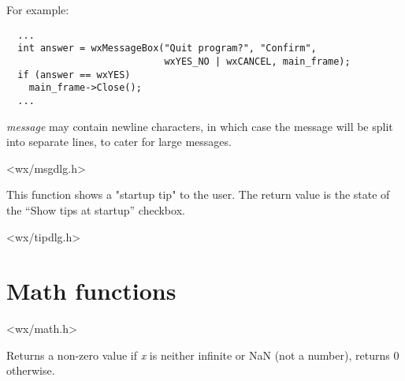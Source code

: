 For example:

\begin{verbatim}
  ...
  int answer = wxMessageBox("Quit program?", "Confirm",
                            wxYES_NO | wxCANCEL, main_frame);
  if (answer == wxYES)
    main_frame->Close();
  ...
\end{verbatim}

{\it message} may contain newline characters, in which case the
message will be split into separate lines, to cater for large messages.


<wx/msgdlg.h>


\label{wxshowtip}


This function shows a "startup tip" to the user. The return value is the
state of the ``Show tips at startup'' checkbox.







<wx/tipdlg.h>




\section{Math functions}\label{mathfunctions}


<wx/math.h>


\label{wxfinite}


Returns a non-zero value if {\it x} is neither infinite or NaN (not a number), 
returns 0 otherwise.



